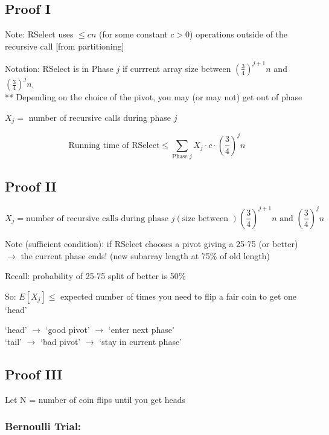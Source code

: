 \documentclass{article}
\begin{document}
\subsection*{Proof I}
Note: RSelect uses \(\leq cn\) (for some constant \(c > 0\)) operations outside
of the recursive call [from partitioning]

Notation: RSelect is in Phase $j$ if currrent array size between \(\left(
\frac{3}{4} \right) ^{j+1} n\) and \(\left( \frac{3}{4} \right) ^j n\). \\
** Depending on the choice of the pivot, you may (or may not) get out of phase

\(X_j = \) number of recursive calls during phase $j$

\begin{equation*}
    \text{Running time of RSelect} \leq \sum_{\text{Phase } j} X_j \cdot c \cdot \left( \frac{3}{4} \right) ^j n
\end{equation*}

\subsection*{Proof II}
\begin{equation*}
    X_j = \text{number of recursive calls during phase } j (\text{size between }) \left( \frac{3}{4} \right) ^{j+1} n \text{ and } \left( \frac{3}{4} \right) ^j n
\end{equation*}

Note (sufficient condition): if RSelect chooses a pivot giving a 25-75 (or better) $\rightarrow$ the current phase ends! (new subarray length at 75\% of old length)

Recall: probability of 25-75 split of better is 50\%

So: \(E[X_j] \leq \) expected number of times you need to flip a fair coin to get one `head'

`head' $\rightarrow$ `good pivot' $\rightarrow$ `enter next phase' \\
`tail' $\rightarrow$ `bad pivot' $\rightarrow$ `stay in current phase'

\subsection*{Proof III}
Let N = number of coin flips until you get heads

\subsubsection*{Bernoulli Trial:}
\end{document}
